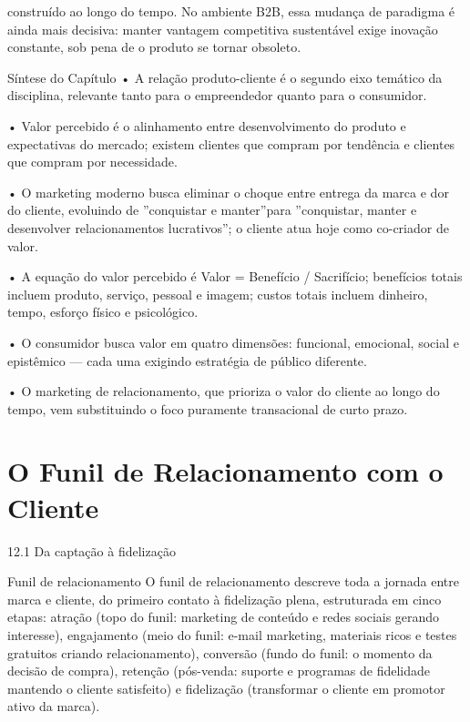 construído ao longo do tempo. No ambiente B2B, essa mudança de paradigma é ainda mais decisiva: manter vantagem competitiva sustentável exige inovação constante, sob pena de o produto se tornar obsoleto.

Síntese do Capítulo • A relação produto-cliente é o segundo eixo temático da disciplina, relevante tanto para o empreendedor quanto para o consumidor.

• Valor percebido é o alinhamento entre desenvolvimento do produto e expectativas do mercado; existem clientes que compram por tendência e clientes que compram por necessidade.

• O marketing moderno busca eliminar o choque entre entrega da marca e dor do cliente, evoluindo de ”conquistar e manter”para ”conquistar, manter e desenvolver relacionamentos lucrativos”; o cliente atua hoje como co-criador de valor.

• A equação do valor percebido é Valor = Benefício / Sacrifício; benefícios totais incluem produto, serviço, pessoal e imagem; custos totais incluem dinheiro, tempo, esforço físico e psicológico.

• O consumidor busca valor em quatro dimensões: funcional, emocional, social e epistêmico — cada uma exigindo estratégia de público diferente.

• O marketing de relacionamento, que prioriza o valor do cliente ao longo do tempo, vem substituindo o foco puramente transacional de curto prazo.

\chapter{O Funil de Relacionamento com o Cliente}

12.1 Da captação à fidelização

Funil de relacionamento O funil de relacionamento descreve toda a jornada entre marca e cliente, do primeiro contato à fidelização plena, estruturada em cinco etapas: atração (topo do funil: marketing de conteúdo e redes sociais gerando interesse), engajamento (meio do funil: e-mail marketing, materiais ricos e testes gratuitos criando relacionamento), conversão (fundo do funil: o momento da decisão de compra), retenção (pós-venda: suporte e programas de fidelidade mantendo o cliente satisfeito) e fidelização (transformar o cliente em promotor ativo da marca).

